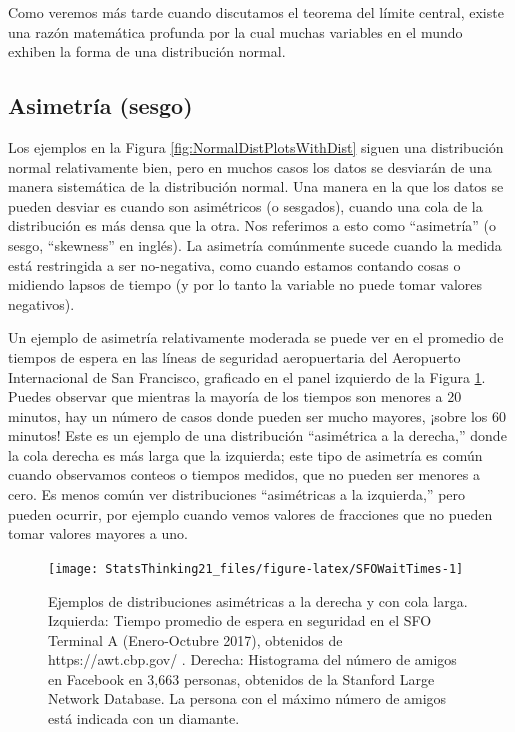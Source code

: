 \documentclass[
  12pt,
]{book}
\begin{document}
Como veremos más tarde cuando discutamos el teorema del límite central, existe una razón matemática profunda por la cual muchas variables en el mundo exhiben la forma de una distribución normal.

\hypertarget{asimetruxeda-sesgo}{%
\subsection{Asimetría (sesgo)}\label{asimetruxeda-sesgo}}

Los ejemplos en la Figura \ref{fig:NormalDistPlotsWithDist} siguen una distribución normal relativamente bien, pero en muchos casos los datos se desviarán de una manera sistemática de la distribución normal. Una manera en la que los datos se pueden desviar es cuando son asimétricos (o sesgados), cuando una cola de la distribución es más densa que la otra. Nos referimos a esto como ``asimetría'' (o sesgo, ``skewness'' en inglés). La asimetría comúnmente sucede cuando la medida está restringida a ser no-negativa, como cuando estamos contando cosas o midiendo lapsos de tiempo (y por lo tanto la variable no puede tomar valores negativos).

Un ejemplo de asimetría relativamente moderada se puede ver en el promedio de tiempos de espera en las líneas de seguridad aeropuertaria del Aeropuerto Internacional de San Francisco, graficado en el panel izquierdo de la Figura \ref{fig:SFOWaitTimes}. Puedes observar que mientras la mayoría de los tiempos son menores a 20 minutos, hay un número de casos donde pueden ser mucho mayores, ¡sobre los 60 minutos! Este es un ejemplo de una distribución ``asimétrica a la derecha,'' donde la cola derecha es más larga que la izquierda; este tipo de asimetría es común cuando observamos conteos o tiempos medidos, que no pueden ser menores a cero. Es menos común ver distribuciones ``asimétricas a la izquierda,'' pero pueden ocurrir, por ejemplo cuando vemos valores de fracciones que no pueden tomar valores mayores a uno.

\begin{figure}
\texttt{[image: StatsThinking21\_files/figure-latex/SFOWaitTimes-1]} \caption{Ejemplos de distribuciones asimétricas a la derecha y con cola larga. Izquierda: Tiempo promedio de espera en seguridad en el SFO Terminal A (Enero-Octubre 2017), obtenidos de https://awt.cbp.gov/ . Derecha: Histograma del número de amigos en Facebook en 3,663 personas, obtenidos de la Stanford Large Network Database. La persona con el máximo número de amigos está indicada con un diamante.}\label{fig:SFOWaitTimes}
\end{figure}
\end{document}
